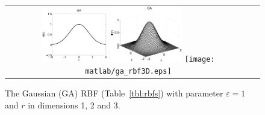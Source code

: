 \begin{figure}[t]
\centering
\begin{tabular}{cc}
\includegraphics[width=0.275\textwidth]{matlab/ga_rbf.pdf}
\includegraphics[width=0.3\textwidth]{matlab/ga_rbf2D.eps}
\texttt{[image: matlab/ga\_rbf3D.eps]}
\end{tabular} 
\caption{The Gaussian (GA) RBF (Table~\ref{tbl:rbfs}) with parameter $\varepsilon=1$ and $r$ in dimensions 1, 2 and 3.}
\label{fig:rbf_dimension_example}
\end{figure} 